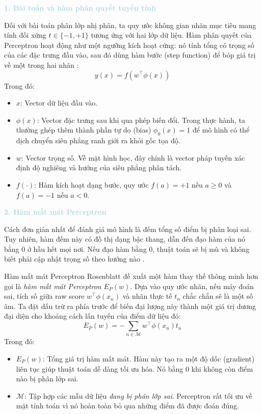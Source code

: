 \vspace{0.5em}
\noindent\textcolor{lightblue}{\textbf{1. Bài toán và hàm phân quyết tuyến tính}}
\vspace{0.5em}

Đối với bài toán phân lớp nhị phân, ta quy ước không gian nhãn mục tiêu mang tính đối xứng $t \in \{-1, +1\}$ tương ứng với hai lớp dữ liệu. Hàm phân quyết của Perceptron hoạt động như một ngưỡng kích hoạt cứng: nó tính tổng có trọng số của các đặc trưng đầu vào, sau đó dùng hàm bước (step function) để bóp giá trị về một trong hai nhãn \cite{bishop2006pattern}:
\begin{equation}
    y(x) = f(w^\top \phi(x))
\end{equation}
Trong đó:
\begin{itemize}
    \item $x$: Vector dữ liệu đầu vào.
    \item $\phi(x)$: Vector đặc trưng sau khi qua phép biến đổi. Trong thực hành, ta thường ghép thêm thành phần tự do (bias) $\phi_0(x) = 1$ để mô hình có thể dịch chuyển siêu phẳng ranh giới ra khỏi gốc tọa độ.
    \item $w$: Vector trọng số. Về mặt hình học, đây chính là vector pháp tuyến xác định độ nghiêng và hướng của siêu phẳng phân tách.
    \item $f(\cdot)$: Hàm kích hoạt dạng bước, quy ước $f(a) = +1$ nếu $a \ge 0$ và $f(a) = -1$ nếu $a < 0$.
\end{itemize}

\vspace{0.5em}
\noindent\textcolor{lightblue}{\textbf{2. Hàm mất mát Perceptron}}
\vspace{0.5em}

Cách đơn giản nhất để đánh giá mô hình là đếm tổng số điểm bị phân loại sai. Tuy nhiên, hàm đếm này có đồ thị dạng bậc thang, dẫn đến đạo hàm của nó bằng $0$ ở hầu hết mọi nơi. Nếu đạo hàm bằng $0$, thuật toán sẽ bị mù và không biết phải cập nhật trọng số theo hướng nào \cite{bishop2006pattern}.

\begin{importantbox}{Hàm mất mát Perceptron}
Rosenblatt đề xuất một hàm thay thế thông minh hơn gọi là \textit{hàm mất mát Perceptron} $E_P(w)$. Dựa vào quy ước nhãn, nếu máy đoán sai, tích số giữa raw score $w^\top \phi(x_n)$ và nhãn thực tế $t_n$ chắc chắn sẽ là một số âm. Ta đặt dấu trừ ra phía trước để biến đại lượng này thành một giá trị dương đại diện cho khoảng cách lấn tuyến của điểm dữ liệu đó:
\begin{equation}
    E_P(w) = - \sum_{n \in \mathcal{M}} w^\top \phi(x_n) t_n
\end{equation}
Trong đó:
\begin{itemize}
    \item $E_P(w)$: Tổng giá trị hàm mất mát. Hàm này tạo ra một độ dốc (gradient) liên tục giúp thuật toán dễ dàng tối ưu hóa. Nó bằng $0$ khi không còn điểm nào bị phân lớp sai.
    \item $\mathcal{M}$: Tập hợp các mẫu dữ liệu \textit{đang bị phân lớp sai}. Perceptron rất tối ưu về mặt tính toán vì nó hoàn toàn bỏ qua những điểm đã được đoán đúng.
\end{itemize}
\end{importantbox}


